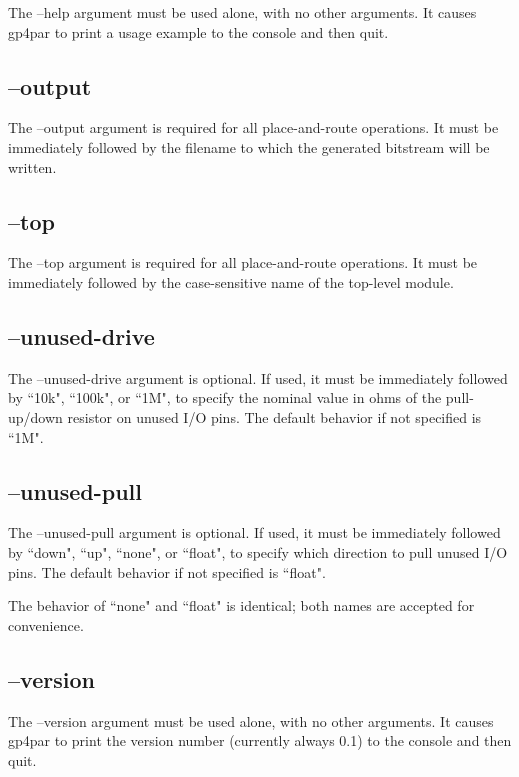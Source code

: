 \documentclass{article}
\begin{document}
The --help argument must be used alone, with no other arguments. It causes gp4par to print a usage example to the 
console and then quit.

\subsection{--output}

The --output argument is required for all place-and-route operations. It must be immediately followed by the 
filename to which the generated bitstream will be written.

\subsection{--top}

The --top argument is required for all place-and-route operations. It must be immediately followed by the 
case-sensitive name of the top-level module.

\subsection{--unused-drive}

The --unused-drive argument is optional. If used, it must be immediately followed by ``10k", ``100k", or ``1M", to 
specify the nominal value in ohms of the pull-up/down resistor on unused I/O pins. The default behavior if not 
specified is ``1M".

\subsection{--unused-pull}

The --unused-pull argument is optional. If used, it must be immediately followed by ``down", ``up", ``none", or 
``float", to specify which direction to pull unused I/O pins. The default behavior if not specified is ``float".

The behavior of ``none" and ``float" is identical; both names are accepted for convenience.

\subsection{--version}

The --version argument must be used alone, with no other arguments. It causes gp4par to print the version number 
(currently always 0.1) to the console and then quit.
\end{document}
